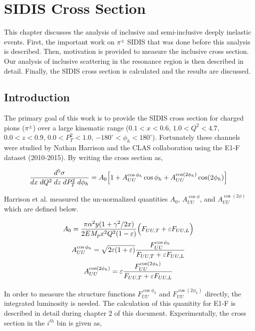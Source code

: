 \chapter{SIDIS Cross Section}

This chapter discusses the analysis of inclusive and semi-inclusive deeply inelastic events.  First, the important work on $\pi^{\pm}$ SIDIS that was done before this analysis is described.  Then, motivation is provided to measure the inclusive cross section.  Our analysis of inclusive scattering in the resonance region is then described in detail.  Finally, the SIDIS cross section is calculated and the results are discussed.

\section{Introduction}

The primary goal of this work is to provide the SIDIS cross section for charged pions ($\pi^{\pm}$) over a large kinematic range ($0.1 < x < 0.6$, $1.0 < Q^2 < 4.7$, $0.0 < z < 0.9$, $0.0 < P_{T}^{2} < 1.0$, $-180^\circ < \phi_h < 180^\circ$).  Fortunately these channels were studied by Nathan Harrison and the CLAS collaboration \cite{analysis-harrison} using the E1-F dataset (2010-2015).  By writing the cross section as, 

\begin{equation}
	\frac{d^5\sigma}{dx \; dQ^2 \; dz \; dP_T^2 \; d\phi_h} = A_{0} \Bigl[ 1 + A_{UU}^{\cos\phi_h} \cos\phi_h + A_{UU}^{\cos(2\phi_h)} \cos(2\phi_h) \Bigr]
\end{equation}

Harrison et al. measured the un-normalized quantities $A_0$, $A_{UU}^{\cos\phi}$, and $A_{UU}^{\cos(2\phi)}$ which are defined below.  

\begin{gather}
	A_{0} = \frac{\pi \alpha^2 y (1+\gamma^2/2x)}{2 E M_p x^2 Q^2 (1-\varepsilon)} \Bigl( F_{UU,T} + \varepsilon F_{UU,L} \Bigr) \\
	A_{UU}^{\cos\phi_h} = \sqrt{2\varepsilon(1+\varepsilon)} \frac{F_{UU}^{\cos\phi_h}}{F_{UU,T} + \varepsilon F_{UU,L}} \\
	A_{UU}^{\cos(2\phi_h)} = \varepsilon \frac{F_{UU}^{\cos(2\phi_h)}}{F_{UU,T} + \varepsilon F_{UU,L}}
\end{gather}

In order to measure the structure functions $F_{UU}^{\cos\phi_h}$ and $F_{UU}^{\cos(2\phi_h)}$ directly, the integrated luminosity is needed.  The calculation of this quanitity for E1-F is described in detail during chapter 2 of this document.  Experimentally, the cross section in the $i^{th}$ bin is given as, 


